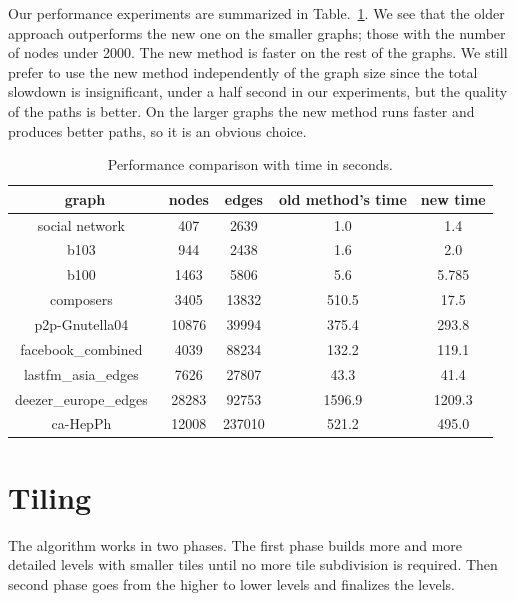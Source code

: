 \documentclass{gd-llncs}
\begin{document}
{Our performance experiments are summarized in Table.~\ref{tab:perf}. We see that the older approach outperforms the new one on the smaller graphs; those with the number of nodes under 2000. The new method is faster on the rest of the graphs. We still prefer to use the new method independently of the graph size since the total slowdown is insignificant, under a half second in our experiments, but the quality of the paths is better. On the larger graphs the new method runs faster and produces better paths, so it is an obvious choice.
\begin{table}
  \begin{center}
    \begin{tabular}{||c |c| c| c| c||}
      \hline
      graph                                   & nodes & edges  & old method's time & new time \\ [0.5ex]
      \hline\hline
      social network~\cite{beveridge2018game} & 407   & 2639   & 1.0               & 1.4      \\
      \hline
      b103~\cite{b103}                        & 944   & 2438   & 1.6               & 2.0      \\
      \hline
      b100~\cite{b100}                        & 1463  & 5806   & 5.6               & 5.785    \\
      \hline
      composers~\cite{composers}              & 3405  & 13832  & 510.5             & 17.5     \\
      \hline
      p2p-Gnutella04~\cite{gnutella}          & 10876 & 39994  & 375.4             & 293.8    \\
      \hline
      facebook\_combined~\cite{fb}            & 4039  & 88234  & 132.2             & 119.1    \\
      \hline
      lastfm\_asia\_edges~\cite{feather}      & 7626  & 27807  & 43.3              & 41.4     \\
      \hline
      deezer\_europe\_edges~\cite{feather}    & 28283 & 92753  & 1596.9            & 1209.3   \\
      \hline
      ca-HepPh~\cite{leskovec2007graph}       & 12008 & 237010 & 521.2             & 495.0    \\
      \hline
    \end{tabular}
    \caption{Performance comparison with time in seconds.}
    \label{tab:perf}
  \end{center}

\end{table}
\section{Tiling}
The algorithm works in two phases. The first phase builds more and more detailed levels with smaller tiles until no more tile subdivision is required. Then second phase goes from the higher to lower levels and finalizes the levels.


}
\end{document}
